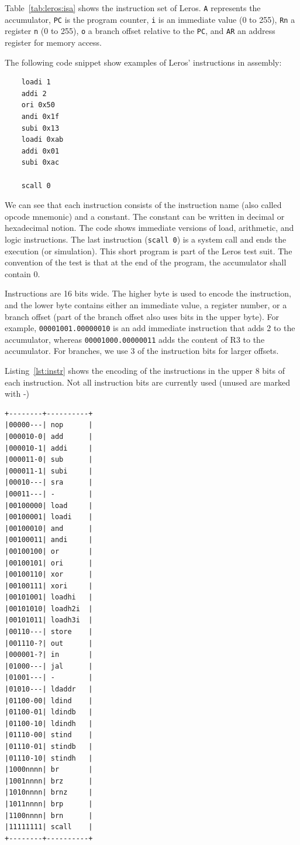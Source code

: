 \documentclass[%
    10pt,
    headinclude, footinclude=false,
    openright, %
    notitlepage,
    cleardoublepage=empty,
    headsepline,
    numbers=noenddot,
    bibliography=totoc, index=totoc,
    ]{scrbook}
\newcommand{\code}[1]{{\lstinline[basicstyle=\small\ttfamily]{#1}}}
\begin{document}
Table~\ref{tab:leros:isa} shows the instruction set of Leros.
\code{A} represents the accumulator, \code{PC} is the program counter,
\code{i} is an immediate value (0 to 255), \code{Rn} a register
\code{n} (0 to 255), \code{o} a branch offset relative to the \code{PC},
and \code{AR} an address register for memory access.

The following code snippet show examples of Leros' instructions in assembly:

\begin{verbatim}
	loadi 1
	addi 2
	ori 0x50
	andi 0x1f
	subi 0x13
	loadi 0xab
	addi 0x01
	subi 0xac

	scall 0
\end{verbatim}

\noindent We can see that each instruction consists of the instruction name (also called
opcode mnemonic) and a constant. The constant can be written in decimal or
hexadecimal notion. The code shows immediate versions of load, arithmetic,
and logic instructions. The last instruction (\code{scall 0}) is a system call and
ends the execution (or simulation).
This short program is part of the Leros test suit.
The convention of the test is that at the end of the program, the accumulator shall
contain 0.

Instructions are 16 bits wide. The higher byte is used to encode the instruction,
and the lower byte contains either an immediate value, a register number,
or a branch offset (part of the branch offset also uses bits in the upper byte).
For example, \code{00001001.00000010} is an add immediate instruction
that adds 2 to the accumulator, whereas \code{00001000.00000011} adds the
content of R3 to the accumulator. For branches, we use 3 of the instruction
bits for larger offsets.

Listing~\ref{lst:instr} shows the encoding of the instructions in the upper 8 bits of
each instruction.
Not all instruction bits are currently used (unused are marked with -)

\begin{lstlisting}[float, caption=Leros instruction encoding., label=lst:instr, frame=tb, captionpos=b]
+--------+----------+
|00000---| nop      |
|000010-0| add      |
|000010-1| addi     |
|000011-0| sub      |
|000011-1| subi     |
|00010---| sra      |
|00011---| -        |
|00100000| load     |
|00100001| loadi    |
|00100010| and      |
|00100011| andi     |
|00100100| or       |
|00100101| ori      |
|00100110| xor      |
|00100111| xori     |
|00101001| loadhi   |
|00101010| loadh2i  |
|00101011| loadh3i  |
|00110---| store    |
|001110-?| out      |
|000001-?| in       |
|01000---| jal      |
|01001---| -        |
|01010---| ldaddr   |
|01100-00| ldind    |
|01100-01| ldindb   |
|01100-10| ldindh   |
|01110-00| stind    |
|01110-01| stindb   |
|01110-10| stindh   |
|1000nnnn| br       |
|1001nnnn| brz      |
|1010nnnn| brnz     |
|1011nnnn| brp      |
|1100nnnn| brn      |
|11111111| scall    |
+--------+----------+
\end{lstlisting}
\end{document}
